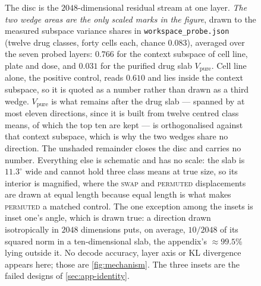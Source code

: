 \begin{figure}[htbp]
\begin{fullwidth}

\caption[The drug slab and the context subspace, by variance
share]{ The disc is the
$2048$-dimensional residual stream at one layer. \emph{The two wedge areas are
the only scaled marks in the figure}, drawn to the measured subspace variance
shares in \texttt{workspace\_probe.json} (twelve drug classes, forty cells
each, chance $0.083$), averaged over the seven probed layers: $0.766$ for the
context subspace of cell line, plate and dose, and $0.031$ for the purified
drug slab $V_{\mathrm{pure}}$. Cell line alone, the positive control, reads
$0.610$ and lies inside the context subspace, so it is quoted as a number
rather than drawn as a third wedge. $V_{\mathrm{pure}}$ is what remains after
the drug slab --- spanned by at most eleven directions, since it is built from
twelve centred class means, of which the top ten are kept --- is orthogonalised
against that context subspace, which is why the two wedges share no direction.
The unshaded remainder closes the disc and carries no number. Everything else
is schematic and has no scale: the slab is $11.3^{\circ}$ wide and cannot hold
three class means at true size, so its interior is magnified, where the
\textsc{swap} and \textsc{permuted} displacements are drawn at equal length
because equal length is what makes \textsc{permuted} a matched control. The one
exception among the insets is inset one's angle, which is drawn true: a
direction drawn isotropically in $2048$ dimensions puts, on average, $10/2048$
of its squared norm in a ten-dimensional slab, the appendix's $\approx 99.5\%$
lying outside it. No decode accuracy, layer axis or KL divergence appears here;
those are \cref{fig:mechanism}. The three insets are the failed designs of
\cref{sec:app-identity}.}
\label{fig:slab}
\end{fullwidth}
\end{figure}


